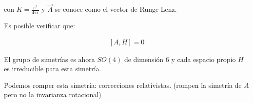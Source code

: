 con $K=\frac{e^2}{4\pi\epsilon}$ y $\vec{A}$ se conoce como el vector de Runge Lenz.

Es posible verificar que:

\begin{align*}
    \left[A,H\right]=0
\end{align*}

El grupo de simetrías es ahora $SO(4)$ de dimensión $6$ y cada espacio propio $H$ es irreducible para esta simetría.

Podemos romper esta simetría: correcciones relativistas. (rompen la simetría de $A$ pero no la invarianza rotacional)



